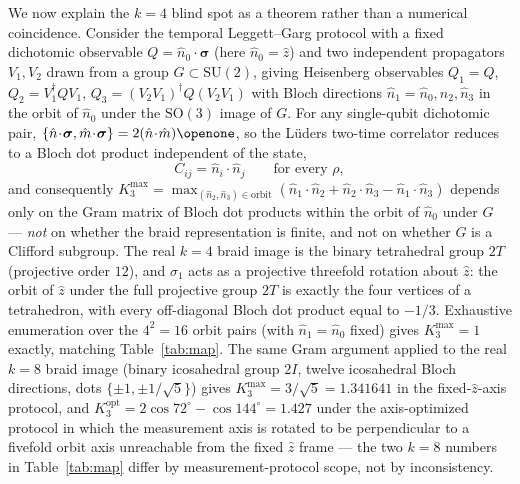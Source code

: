 \documentclass[aps,pra,twocolumn,superscriptaddress,longbibliography,floatfix,nofootinbib]{revtex4-2}
\begin{document}
We now explain the $k=4$ blind spot as a theorem rather than a
numerical coincidence. Consider the temporal Leggett--Garg protocol
with a fixed dichotomic observable $Q=\hat n_0\!\cdot\!\bm\sigma$
(here $\hat n_0=\hat z$) and two independent propagators $V_1,V_2$
drawn from a group $G\subset\mathrm{SU}(2)$, giving Heisenberg
observables $Q_1=Q$, $Q_2=V_1^\dagger QV_1$, $Q_3=(V_2V_1)^\dagger
Q(V_2V_1)$ with Bloch directions $\hat n_1=\hat n_0,\hat n_2,\hat
n_3$ in the orbit of $\hat n_0$ under the $\mathrm{SO}(3)$ image of
$G$. For any single-qubit dichotomic pair,
$\{\hat n\!\cdot\!\bm\sigma,\hat m\!\cdot\!\bm\sigma\}
=2(\hat n\!\cdot\!\hat m)\openone$, so the Lüders two-time
correlator reduces to a Bloch dot product independent of the state,
\begin{equation}
\label{eq:gram}
C_{ij} = \hat n_i\cdot\hat n_j \qquad \text{for every } \rho,
\end{equation}
and consequently
$K_3^{\max}=\max_{(\hat n_2,\hat n_3)\in\text{orbit}}
(\hat n_1\!\cdot\!\hat n_2+\hat n_2\!\cdot\!\hat n_3-\hat n_1\!\cdot\!\hat n_3)$
depends only on the Gram matrix of Bloch dot products within the
orbit of $\hat n_0$ under $G$ --- \emph{not} on whether the braid
representation is finite, and not on whether $G$ is a Clifford
subgroup. The real $k=4$ braid image is the binary tetrahedral group
$2T$ (projective order $12$), and $\sigma_1$ acts as a projective
threefold rotation about $\hat z$: the orbit of $\hat z$ under the
full projective group $2T$ is exactly the four vertices of a
tetrahedron, with every
off-diagonal Bloch dot product equal to $-1/3$. Exhaustive
enumeration over the $4^2=16$ orbit pairs (with $\hat n_1=\hat n_0$
fixed) gives $K_3^{\max}=1$ exactly, matching Table~\ref{tab:map}. The same
Gram argument applied to the real $k=8$ braid image (binary
icosahedral group $2I$, twelve icosahedral Bloch directions, dots
$\{\pm1,\pm1/\sqrt5\}$) gives $K_3^{\max}=3/\sqrt5=1.341641$ in the
fixed-$\hat z$-axis protocol, and $K_3^{\mathrm{opt}}=2\cos72^\circ
-\cos144^\circ=1.427$ under the axis-optimized protocol in which the
measurement axis is rotated to be perpendicular to a fivefold orbit
axis unreachable from the fixed $\hat z$ frame --- the two $k=8$
numbers in Table~\ref{tab:map} differ by measurement-protocol scope,
not by inconsistency.
\end{document}
